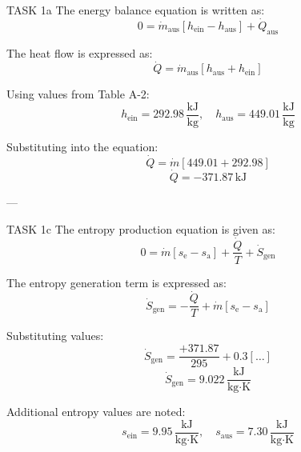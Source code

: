 TASK 1a  
The energy balance equation is written as:  
\[
0 = \dot{m}_{\text{aus}} \left[ h_{\text{ein}} - h_{\text{aus}} \right] + \dot{Q}_{\text{aus}}
\]  

The heat flow is expressed as:  
\[
\dot{Q} = \dot{m}_{\text{aus}} \left[ h_{\text{aus}} + h_{\text{ein}} \right]
\]  

Using values from Table A-2:  
\[
h_{\text{ein}} = 292.98 \, \frac{\text{kJ}}{\text{kg}}, \quad h_{\text{aus}} = 449.01 \, \frac{\text{kJ}}{\text{kg}}
\]  

Substituting into the equation:  
\[
\dot{Q} = \dot{m} \left[ 449.01 + 292.98 \right]
\]  
\[
\dot{Q} = -371.87 \, \text{kJ}
\]  

---

TASK 1c  
The entropy production equation is given as:  
\[
0 = \dot{m} \left[ s_{\text{e}} - s_{\text{a}} \right] + \frac{\dot{Q}}{T} + \dot{S}_{\text{gen}}
\]  

The entropy generation term is expressed as:  
\[
\dot{S}_{\text{gen}} = -\frac{\dot{Q}}{T} + \dot{m} \left[ s_{\text{e}} - s_{\text{a}} \right]
\]  

Substituting values:  
\[
\dot{S}_{\text{gen}} = \frac{+371.87}{295} + 0.3 \left[ \ldots \right]
\]  
\[
\dot{S}_{\text{gen}} = 9.022 \, \frac{\text{kJ}}{\text{kg·K}}
\]  

Additional entropy values are noted:  
\[
s_{\text{ein}} = 9.95 \, \frac{\text{kJ}}{\text{kg·K}}, \quad s_{\text{aus}} = 7.30 \, \frac{\text{kJ}}{\text{kg·K}}
\]